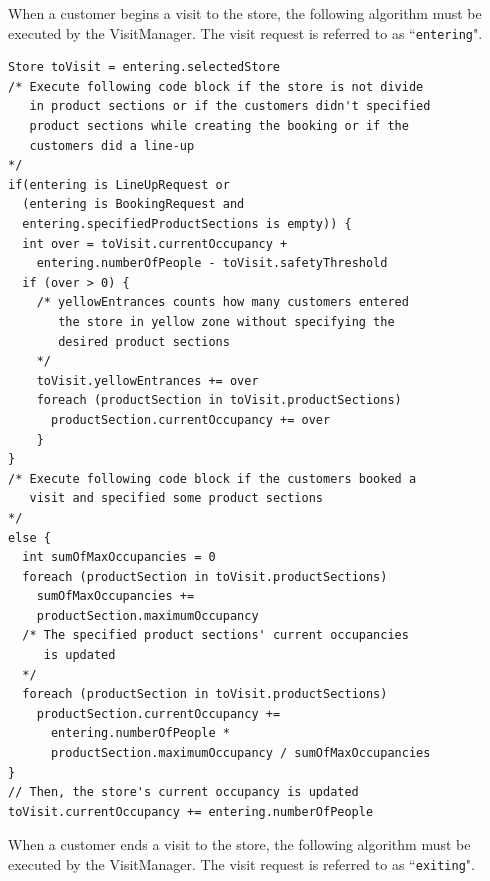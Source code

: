 \documentclass[a4paper,oneside,11pt]{book}
\begin{document}
    \newpage
    When a customer begins a visit to the store, the following algorithm must be executed by the VisitManager. The visit request is referred to as  ``\texttt{entering}".
    \begin{lstlisting}[language=pseudocodeDD]
Store toVisit = entering.selectedStore
/* Execute following code block if the store is not divide
   in product sections or if the customers didn't specified
   product sections while creating the booking or if the 
   customers did a line-up
*/
if(entering is LineUpRequest or 
  (entering is BookingRequest and
  entering.specifiedProductSections is empty)) {
  int over = toVisit.currentOccupancy +   
    entering.numberOfPeople - toVisit.safetyThreshold
  if (over > 0) { 
    /* yellowEntrances counts how many customers entered 
       the store in yellow zone without specifying the 
       desired product sections
    */
    toVisit.yellowEntrances += over
    foreach (productSection in toVisit.productSections)
      productSection.currentOccupancy += over
    }
}
/* Execute following code block if the customers booked a 
   visit and specified some product sections
*/
else {
  int sumOfMaxOccupancies = 0
  foreach (productSection in toVisit.productSections)
    sumOfMaxOccupancies += 
    productSection.maximumOccupancy
  /* The specified product sections' current occupancies 
     is updated
  */
  foreach (productSection in toVisit.productSections)
    productSection.currentOccupancy += 
      entering.numberOfPeople *          
      productSection.maximumOccupancy / sumOfMaxOccupancies
}
// Then, the store's current occupancy is updated
toVisit.currentOccupancy += entering.numberOfPeople
    \end{lstlisting}
    \newpage 
    When a customer ends a visit to the store, the following algorithm must be executed by the VisitManager. The visit request is referred to as  ``\texttt{exiting}". 
    
\end{document}
